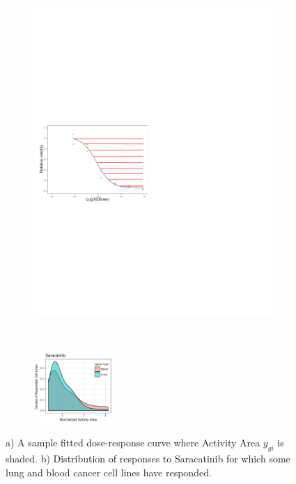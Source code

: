 \begin{figure}
	\centering
	\begin{subfigure}[b]{0.22\textwidth}
		\includegraphics[width=\textwidth]{./img/dr4.pdf}
		\caption{}\label{fig:dr}
	\end{subfigure} ~
	\begin{subfigure}[b]{0.22\textwidth}
		\includegraphics[height=2.7cm]{./img/Saracatinib.pdf}
		\caption{}\label{fig:Saracatinib}
	\end{subfigure}
	\squeezeup
	\caption{a) A sample fitted dose-response curve where Activity Area $y_{gi}$ is shaded. b) Distribution of responses to Saracatinib for which some lung and blood cancer cell lines have responded.}
	\label{fig syn3}
\end{figure}
